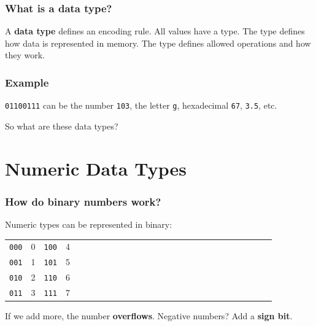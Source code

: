 \documentclass[11pt]{beamer}
\begin{document}
\begin{frame}
  \frametitle{What is a \textbf{data type}?}
  \Enlarge

  \begin{itemize}
  \myitem  A \textbf{data type} defines an encoding rule.
  \myitem  All values have a type.
  \myitem  The type defines how data is represented in memory.
  \myitem  The type defines allowed operations and how they work.
  \end{itemize}
\end{frame}

\begin{frame}
  \frametitle{Example}
  \Enlarge

  \texttt{01100111} can be the number \texttt{103}, the letter \texttt{g}, hexadecimal \texttt{67}, \texttt{3.5}, etc.
  \begin{itemize}
  \myitem  So what are these data types?
  \end{itemize}
\end{frame}

\section{Numeric Data Types}

\begin{frame}
  \frametitle{How do binary numbers work?}
  \Enlarge

  \begin{itemize}
  \myitem  Numeric types can be represented in binary:
    \begin{tabular}{*{27}{l}}
      \texttt{000} & 0 & \texttt{100} & 4 \\
      \texttt{001} & 1 & \texttt{101} & 5 \\
      \texttt{010} & 2 & \texttt{110} & 6 \\
      \texttt{011} & 3 & \texttt{111} & 7 \\
    \end{tabular}
  \myitem  If we add more, the number \textbf{overflows}.
  \myitem  Negative numbers?  Add a \textbf{sign bit}.
  \end{itemize}
\end{frame}
\end{document}
